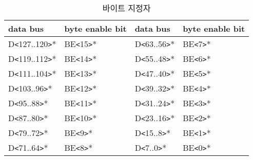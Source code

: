 %
%
\begin{table}[htbp]
\caption{바이트 지정자}
   \begin{center}
   \begin{tabular}{|l|l||l|l|} \hline
      data bus & byte enable bit & data bus & byte enable bit \\ \hline \hline
      D{\tt <}127..120{\tt >}* & BE{\tt <}15{\tt >}* &
      D{\tt <}63..56{\tt >}* & BE{\tt <}7{\tt >}* \\ \hline
      D{\tt <}119..112{\tt >}* & BE{\tt <}14{\tt >}* &
      D{\tt <}55..48{\tt >}* & BE{\tt <}6{\tt >}* \\ \hline
      D{\tt <}111..104{\tt >}* & BE{\tt <}13{\tt >}* &
      D{\tt <}47..40{\tt >}* & BE{\tt <}5{\tt >}* \\ \hline
      D{\tt <}103..96{\tt >}* & BE{\tt <}12{\tt >}* &
      D{\tt <}39..32{\tt >}* & BE{\tt <}4{\tt >}* \\ \hline
      D{\tt <}95..88{\tt >}* & BE{\tt <}11{\tt >}* &
      D{\tt <}31..24{\tt >}* & BE{\tt <}3{\tt >}* \\ \hline
      D{\tt <}87..80{\tt >}* & BE{\tt <}10{\tt >}* &
      D{\tt <}23..16{\tt >}* & BE{\tt <}2{\tt >}* \\ \hline
      D{\tt <}79..72{\tt >}* & BE{\tt <}9{\tt >}* &
      D{\tt <}15..8{\tt >}* & BE{\tt <}1{\tt >}* \\ \hline
      D{\tt <}71..64{\tt >}* & BE{\tt <}8{\tt >}* &
      D{\tt <}7..0{\tt >}* & BE{\tt <}0{\tt >}* \\ \hline
   \end{tabular}
   \end{center}
\end{table}
%
%
